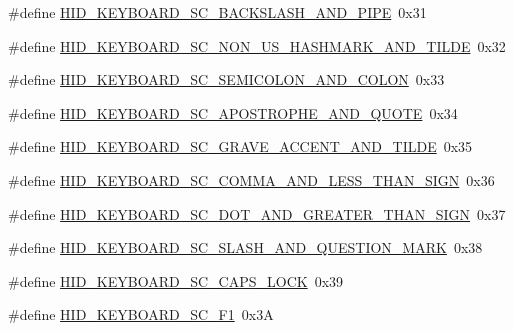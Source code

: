 \begin{DoxyCompactItemize}
\item 
\#define \hyperlink{group__Group__USBClassHIDCommon_gac1fec6ff2a99033cb186b81582aa0707}{H\+I\+D\+\_\+\+K\+E\+Y\+B\+O\+A\+R\+D\+\_\+\+S\+C\+\_\+\+B\+A\+C\+K\+S\+L\+A\+S\+H\+\_\+\+A\+N\+D\+\_\+\+P\+I\+PE}~0x31
\item 
\#define \hyperlink{group__Group__USBClassHIDCommon_ga00c5eaa1fc20d4da9eb8ec00989adaa6}{H\+I\+D\+\_\+\+K\+E\+Y\+B\+O\+A\+R\+D\+\_\+\+S\+C\+\_\+\+N\+O\+N\+\_\+\+U\+S\+\_\+\+H\+A\+S\+H\+M\+A\+R\+K\+\_\+\+A\+N\+D\+\_\+\+T\+I\+L\+DE}~0x32
\item 
\#define \hyperlink{group__Group__USBClassHIDCommon_ga3a6b73d05f36b37a3343330d45fa2268}{H\+I\+D\+\_\+\+K\+E\+Y\+B\+O\+A\+R\+D\+\_\+\+S\+C\+\_\+\+S\+E\+M\+I\+C\+O\+L\+O\+N\+\_\+\+A\+N\+D\+\_\+\+C\+O\+L\+ON}~0x33
\item 
\#define \hyperlink{group__Group__USBClassHIDCommon_ga9faa3e17496b7fb4ddce7d9b09b172ae}{H\+I\+D\+\_\+\+K\+E\+Y\+B\+O\+A\+R\+D\+\_\+\+S\+C\+\_\+\+A\+P\+O\+S\+T\+R\+O\+P\+H\+E\+\_\+\+A\+N\+D\+\_\+\+Q\+U\+O\+TE}~0x34
\item 
\#define \hyperlink{group__Group__USBClassHIDCommon_ga5a62044157159ba6c65a8eb56b30e173}{H\+I\+D\+\_\+\+K\+E\+Y\+B\+O\+A\+R\+D\+\_\+\+S\+C\+\_\+\+G\+R\+A\+V\+E\+\_\+\+A\+C\+C\+E\+N\+T\+\_\+\+A\+N\+D\+\_\+\+T\+I\+L\+DE}~0x35
\item 
\#define \hyperlink{group__Group__USBClassHIDCommon_gaab6b940e535a2fb433f00ba34f741afa}{H\+I\+D\+\_\+\+K\+E\+Y\+B\+O\+A\+R\+D\+\_\+\+S\+C\+\_\+\+C\+O\+M\+M\+A\+\_\+\+A\+N\+D\+\_\+\+L\+E\+S\+S\+\_\+\+T\+H\+A\+N\+\_\+\+S\+I\+GN}~0x36
\item 
\#define \hyperlink{group__Group__USBClassHIDCommon_ga092b394782cd8e11062949c1975f21ab}{H\+I\+D\+\_\+\+K\+E\+Y\+B\+O\+A\+R\+D\+\_\+\+S\+C\+\_\+\+D\+O\+T\+\_\+\+A\+N\+D\+\_\+\+G\+R\+E\+A\+T\+E\+R\+\_\+\+T\+H\+A\+N\+\_\+\+S\+I\+GN}~0x37
\item 
\#define \hyperlink{group__Group__USBClassHIDCommon_ga67fbc4c4c7e81c9bf7384bc660047eea}{H\+I\+D\+\_\+\+K\+E\+Y\+B\+O\+A\+R\+D\+\_\+\+S\+C\+\_\+\+S\+L\+A\+S\+H\+\_\+\+A\+N\+D\+\_\+\+Q\+U\+E\+S\+T\+I\+O\+N\+\_\+\+M\+A\+RK}~0x38
\item 
\#define \hyperlink{group__Group__USBClassHIDCommon_ga2292dc6965f6cfdcb8ebd6850783ec10}{H\+I\+D\+\_\+\+K\+E\+Y\+B\+O\+A\+R\+D\+\_\+\+S\+C\+\_\+\+C\+A\+P\+S\+\_\+\+L\+O\+CK}~0x39
\item 
\#define \hyperlink{group__Group__USBClassHIDCommon_ga68e7b6fdf539719ae4c78d6633431114}{H\+I\+D\+\_\+\+K\+E\+Y\+B\+O\+A\+R\+D\+\_\+\+S\+C\+\_\+\+F1}~0x3A
\item 

\end{DoxyCompactItemize}
